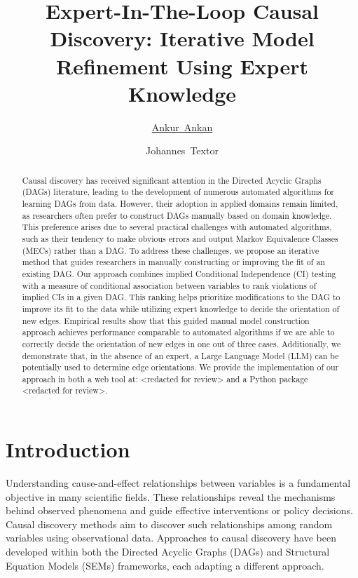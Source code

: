 \documentclass{uai2025} %
\title{Expert-In-The-Loop Causal Discovery: Iterative Model Refinement Using Expert Knowledge}
\author[1]{\href{mailto:<ankur.ankan@ru.nl>?Subject=Your UAI 2025 paper}{Ankur~Ankan}{}}
\author[1]{Johannes~Textor}
\affil[1]{%
    Institute for Computing and Information Sciences\\
    Radboud University\\
    Nijmegen, The Netherlands
}
\begin{document}
\maketitle

\begin{abstract}

Causal discovery has received significant attention in the Directed Acyclic
Graphs (DAGs) literature, leading to the development of numerous automated
algorithms for learning DAGs from data. However, their adoption in applied
domains remain limited, as researchers often prefer to construct DAGs manually
based on domain knowledge. This preference arises due to several practical
challenges with automated algorithms, such as their tendency to make obvious
errors and output Markov Equivalence Classes (MECs) rather than a DAG. To
address these challenges, we propose an iterative method that guides
researchers in manually constructing or improving the fit of an existing DAG.
Our approach combines implied Conditional Independence (CI) testing with a
measure of conditional association between variables to rank violations
of implied CIs in a given DAG. This ranking helps prioritize modifications to
the DAG to improve its fit to the data while utilizing expert knowledge to
decide the orientation of new edges. Empirical results show that this guided
manual model construction approach achieves performance comparable to automated
algorithms if we are able to correctly decide the orientation of new edges in
one out of three cases. Additionally, we demonstrate that, in the absence of an
expert, a Large Language Model (LLM) can be potentially used to determine edge
orientations. We provide the implementation of our approach in both a web tool
at: <redacted for review> and a Python package <redacted for review>.

\end{abstract}

\section{Introduction}
Understanding cause-and-effect relationships between variables is a fundamental
objective in many scientific fields. These relationships reveal the mechanisms
behind observed phenomena and guide effective interventions or policy
decisions. Causal discovery methods aim to discover such relationships
among random variables using observational data. Approaches to causal discovery
have been developed within both the Directed Acyclic Graphs (DAGs) and
Structural Equation Models (SEMs) frameworks, each adapting a different
approach.
\end{document}
